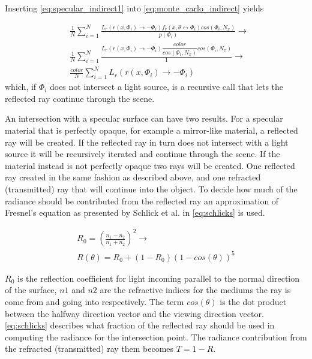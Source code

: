 \documentclass[a4paper, 12pt]{report}
\begin{document}
Inserting \autoref{eq:specular_indirect1} into \autoref{eq:monte_carlo_indirect} yields

\begin{subequations} \label{eq:specular_indirect2}
\begin{align}
	&\nonumber \frac{1}{N} \sum^{N}_{i=1} \frac{L_r(r(x,\Phi_i) \rightarrow -\Phi_i) f_r(x, \theta \leftrightarrow \Phi_i)cos(\Phi_i, N_x)}{p(\Phi_i)} \rightarrow \\
	&\nonumber \frac{1}{N} \sum^{N}_{i=1} \frac{L_r(r(x,\Phi_i) \rightarrow -\Phi_i) \dfrac{color}{cos(\Phi_i,N_x)} cos(\Phi_i, N_x)}{1} \rightarrow \\
	&\frac{color}{N} \sum^{N}_{i=1} L_r(r(x,\Phi_i) \rightarrow -\Phi_i)
\end{align}
\end{subequations}
which, if $\Phi_i$ does not intersect a light source, is a recursive call that lets the reflected ray continue through the scene.

An intersection with a specular surface can have two results. 
For a specular material that is perfectly opaque, for example a mirror-like material, a reflected ray will be created. 
If the reflected ray in turn does not intersect with a light source it will be recursively iterated and continue through the scene.
If the material instead is not perfectly opaque two rays will be created.
One reflected ray created in the same fashion as described above, and one refracted (transmitted) ray that will continue into the object.
To decide how much of the radiance should be contributed from the reflected ray an approximation of Fresnel's equation as presented by Schlick et al. \cite{schlick} in \autoref{eq:schlicks} is used.

\begin{subequations} \label{eq:schlicks}
\begin{align}
R_0 = \left( \frac{n_1-n_2}{n_1+n_2} \right) ^2 \rightarrow \\
R(\theta) = R_0+ (1-R_0)(1-cos(\theta))^5
\end{align}
\end{subequations}

$R_0$ is the reflection coefficient for light incoming parallel to the normal direction of the surface, $n1$ and $n2$ are the refractive indices for the mediums the ray is come from and going into respectively.
The term $cos(\theta)$ is the dot product between the halfway direction vector and the viewing direction vector. \autoref{eq:schlicks} describes what fraction of the reflected ray should be used in computing the radiance for the intersection point. 
The radiance contribution from the refracted (transmitted) ray them becomes $T=1-R$.
\end{document}
